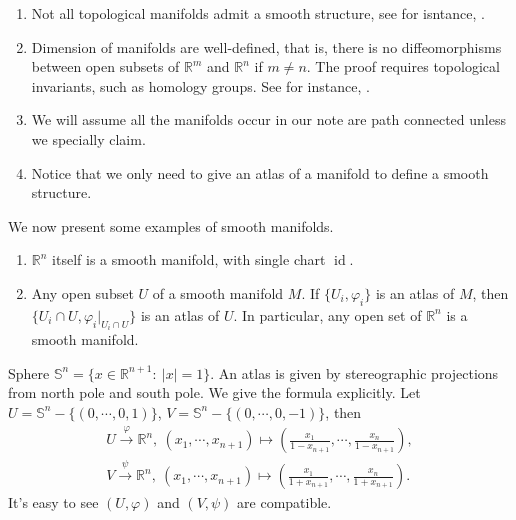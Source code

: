 \begin{rem}
    \begin{enumerate}[(1)]
        \item Not all topological manifolds admit a smooth structure, see for isntance, \cite{Kervaire}.
        \item Dimension of manifolds are well-defined, that is, there is no diffeomorphisms between open subsets of $\mathbb{R}^m$ and $\mathbb{R}^n$ if $m\neq n$.
        The proof requires topological invariants, such as homology groups.
        See for instance, \cite[Theorem~2.55]{LeeTM}.
        \item We will assume all the manifolds occur in our note are path connected unless we specially claim.
        \item Notice that we only need to give an atlas of a manifold to define a smooth structure.
    \end{enumerate}
\end{rem}

We now present some examples of smooth manifolds.

\begin{eg}
    \begin{enumerate}[(1)]
        \item $\mathbb{R}^n$ itself is a smooth manifold, with single chart $\operatorname{id}$.
        \item Any open subset $U$ of a smooth manifold $M$.
        If $\{U_i,\varphi_i\}$ is an atlas of $M$, then $\{U_i\cap U,\varphi_i|_{U_i\cap U}\}$ is an atlas of $U$.
        In particular, any open set of $\mathbb{R}^n$ is a smooth manifold.
    \end{enumerate}
\end{eg}

\begin{eg}
    Sphere $\mathbb{S}^n=\{x\in\mathbb{R}^{n+1}:\ |x|=1\}$.
    An atlas is given by stereographic projections from north pole and south pole.
    We give the formula explicitly.
    Let $U=\mathbb{S}^n-\{(0,\cdots,0,1)\}$, $V=\mathbb{S}^n-\{(0,\cdots,0,-1)\}$, then
    \begin{gather*}
        U\xrightarrow{\varphi}\mathbb{R}^n,\ (x_1,\cdots,x_{n+1})\mapsto\left(\frac{x_1}{1-x_{n+1}},\cdots,\frac{x_n}{1-x_{n+1}}\right),\\
        V\xrightarrow{\psi}\mathbb{R}^n,\ (x_1,\cdots,x_{n+1})\mapsto\left(\frac{x_1}{1+x_{n+1}},\cdots,\frac{x_n}{1+x_{n+1}}\right).
    \end{gather*}
    It's easy to see $(U,\varphi)$ and $(V,\psi)$ are compatible.
\end{eg}

